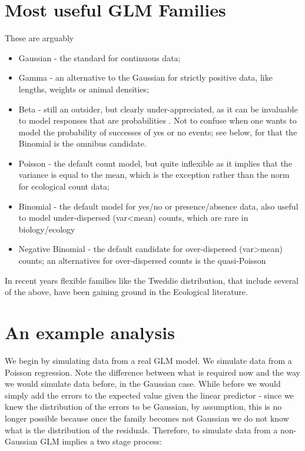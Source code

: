 \documentclass[
]{book}
\providecommand{\tightlist}{%
  \setlength{\itemsep}{0pt}\setlength{\parskip}{0pt}}
\begin{document}
\section{Most useful GLM Families}\label{most-useful-glm-families}

These are arguably

\begin{itemize}
\tightlist
\item
  Gaussian - the standard for continuous data;
\item
  Gamma - an alternative to the Gaussian for strictly positive data, like lengths, weights or animal densities;
\item
  Beta - still an outsider, but clearly under-appreciated, as it can be invaluable to model responses that are probabilities \citep{Douma2019}. Not to confuse when one wants to model the probability of successes of yes or no events; see below, for that the Binomial is the omnibus candidate.
\item
  Poisson - the default count model, but quite inflexible as it implies that the variance is equal to the mean, which is the exception rather than the norm for ecological count data;
\item
  Binomial - the default model for yes/no or presence/absence data, also useful to model under-dispersed (var\textless mean) counts, which are rare in biology/ecology
\item
  Negative Binomial - the default candidate for over-dispersed (var\textgreater mean) counts; an alternatives for over-dispersed counts is the quasi-Poisson \citep{Hoef2007}
\end{itemize}

In recent years flexible families like the Tweddie distribution, that include several of the above, have been gaining ground in the Ecological literature.

\section{An example analysis}\label{an-example-analysis}

We begin by simulating data from a real GLM model. We simulate data from a Poisson regression. Note the difference between what is required now and the way we would simulate data before, in the Gaussian case. While before we would simply add the errors to the expected value given the linear predictor - since we knew the distribution of the errors to be Gaussian, by assumption, this is no longer possible because once the family becomes not Gaussian we do not know what is the distribution of the residuals. Therefore, to simulate data from a non-Gaussian GLM implies a two stage process:
\end{document}

